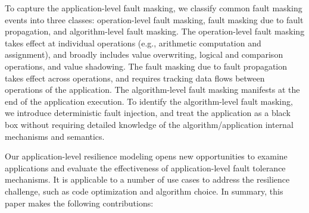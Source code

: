 To capture the application-level fault masking, we classify common fault masking events
into three classes: operation-level fault masking, fault masking due to fault propagation,
and algorithm-level fault masking. The operation-level fault masking 
takes effect at individual operations (e.g., arithmetic computation and assignment), and broadly includes
value overwriting, logical and comparison operations, and value shadowing.
The fault masking due to fault propagation takes effect across operations,
and requires tracking data flows between operations of the application. %
The algorithm-level fault masking manifests at the end of the application execution.
To identify the algorithm-level fault masking, 
we introduce deterministic fault injection, and
treat the application as a black box without requiring 
detailed knowledge of the algorithm/application internal mechanisms and semantics. 

Our application-level resilience modeling opens new opportunities to
examine applications and evaluate the effectiveness of application-level fault 
tolerance mechanisms. It is applicable to a number of use cases to address the resilience challenge, such as code optimization and algorithm choice.
In summary, this paper makes the following contributions:

